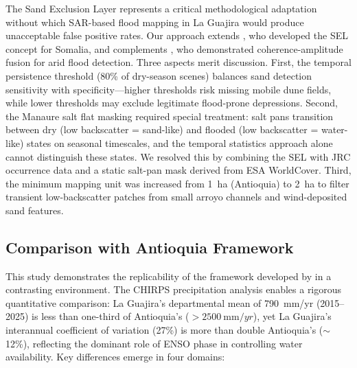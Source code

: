 \documentclass{article}
\begin{document}
The Sand Exclusion Layer represents a critical methodological adaptation without which SAR-based flood mapping in La Guajira would produce unacceptable false positive rates. Our approach extends \citet{Martinis2018}, who developed the SEL concept for Somalia, and complements \citet{Garg2024}, who demonstrated coherence-amplitude fusion for arid flood detection. Three aspects merit discussion. First, the temporal persistence threshold (80\% of dry-season scenes) balances sand detection sensitivity with specificity---higher thresholds risk missing mobile dune fields, while lower thresholds may exclude legitimate flood-prone depressions. Second, the Manaure salt flat masking required special treatment: salt pans transition between dry (low backscatter = sand-like) and flooded (low backscatter = water-like) states on seasonal timescales, and the temporal statistics approach alone cannot distinguish these states. We resolved this by combining the SEL with JRC occurrence data and a static salt-pan mask derived from ESA WorldCover. Third, the minimum mapping unit was increased from \SI{1}{\hectare} (Antioquia) to \SI{2}{\hectare} to filter transient low-backscatter patches from small arroyo channels and wind-deposited sand features.

\subsection{Comparison with Antioquia Framework}

This study demonstrates the replicability of the framework developed by \citet{EspinalMaya2026} in a contrasting environment. The CHIRPS precipitation analysis enables a rigorous quantitative comparison: La Guajira's departmental mean of \SI{790}{\milli\metre/yr} (2015--2025) is less than one-third of Antioquia's ($>\SI{2500}{\milli\metre/yr}$), yet La Guajira's interannual coefficient of variation (27\%) is more than double Antioquia's ($\sim$12\%), reflecting the dominant role of ENSO phase in controlling water availability. Key differences emerge in four domains:
\end{document}
